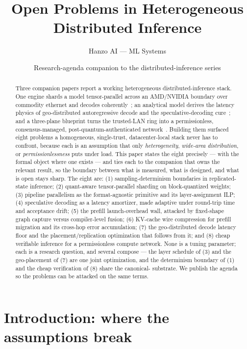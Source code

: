 \documentclass[11pt]{article}
\title{\textbf{Open Problems in Heterogeneous\\ Distributed Inference}}
\author{Hanzo AI --- ML Systems}
\date{Research-agenda companion to the distributed-inference series}
\begin{document}
\maketitle

\begin{abstract}
Three companion papers report a working heterogeneous distributed-inference stack. One engine shards a
model tensor-parallel across an AMD/NVIDIA boundary over commodity ethernet and decodes
coherently~\cite{het}; an analytical model derives the latency physics of geo-distributed autoregressive
decode and the speculative-decoding cure~\cite{latency}; and a three-plane blueprint turns the
trusted-LAN ring into a permissionless, consensus-managed, post-quantum-authenticated
network~\cite{consensus}. Building them surfaced eight problems a homogeneous, single-trust,
datacenter-local stack never has to confront, because each is an assumption that only \emph{heterogeneity},
\emph{wide-area distribution}, or \emph{permissionlessness} puts under load. This paper states the eight
precisely --- with the formal object where one exists --- and ties each to the companion that owns the
relevant result, so the boundary between what is measured, what is designed, and what is open stays sharp.
The eight are: (1) sampling-determinism boundaries in replicated-state inference; (2) quant-aware
tensor-parallel sharding on block-quantized weights; (3) pipeline parallelism as the format-agnostic
primitive and its layer-assignment ILP; (4) speculative decoding as a latency amortizer, made adaptive
under round-trip time and acceptance drift; (5) the prefill launch-overhead wall, attacked by fixed-shape
graph capture versus compiler-level fusion; (6) KV-cache wire compression for prefill migration and its
cross-hop error accumulation; (7) the geo-distributed decode latency floor and the placement/replication
optimization that follows from it; and (8) cheap verifiable inference for a permissionless compute
network. None is a tuning parameter; each is a research question, and several compose --- the layer
schedule of (3) and the geo-placement of (7) are one joint optimization, and the determinism boundary of
(1) and the cheap verification of (8) share the canonical- substrate. We publish the agenda so
the problems can be attacked on the same terms.
\end{abstract}

\section{Introduction: where the assumptions break}
\label{sec:intro}
\end{document}
